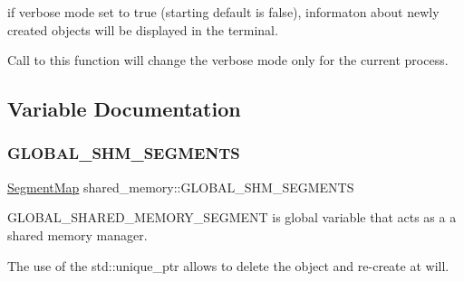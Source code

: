 if verbose mode set to true (starting default is false), informaton about newly created objects will be displayed in the terminal. 

Call to this function will change the verbose mode only for the current process. 

\subsection{Variable Documentation}
\mbox{\label{namespaceshared__memory_ad1f78482aa062e165f37fd49e2e8f539}} 
\subsubsection{\texorpdfstring{G\+L\+O\+B\+A\+L\+\_\+\+S\+H\+M\+\_\+\+S\+E\+G\+M\+E\+N\+TS}{GLOBAL\_SHM\_SEGMENTS}}
{\footnotesize\ttfamily \hyperlink{namespaceshared__memory_a9aeebdfb6185497cac7c093cf3d765c5}{Segment\+Map} shared\+\_\+memory\+::\+G\+L\+O\+B\+A\+L\+\_\+\+S\+H\+M\+\_\+\+S\+E\+G\+M\+E\+N\+TS\hspace{0.3cm}{\ttfamily [static]}}



G\+L\+O\+B\+A\+L\+\_\+\+S\+H\+A\+R\+E\+D\+\_\+\+M\+E\+M\+O\+R\+Y\+\_\+\+S\+E\+G\+M\+E\+NT is global variable that acts as a a shared memory manager. 

The use of the std\+::unique\+\_\+ptr allows to delete the object and re-\/create at will. 